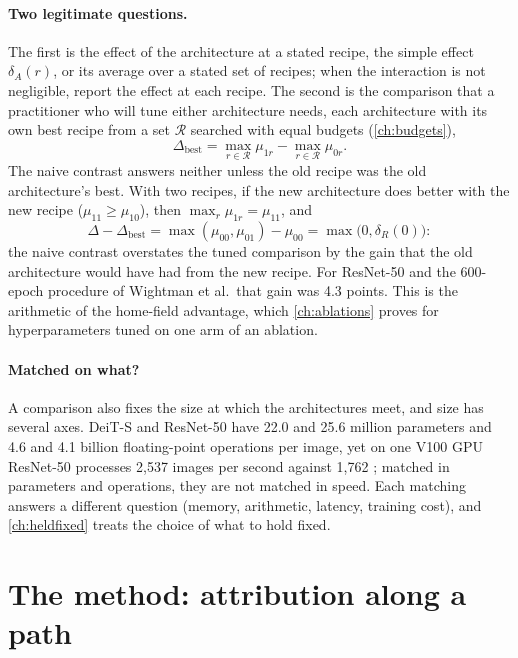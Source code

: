 \begin{refsection}
\paragraph{Two legitimate questions.} The first is the effect of the architecture at a stated recipe, the simple effect $\delta_A(r)$, or its average over a stated set of recipes; when the interaction is not negligible, report the effect at each recipe. The second is the comparison that a practitioner who will tune either architecture needs, each architecture with its own best recipe from a set $\mathcal R$ searched with equal budgets (\cref{ch:budgets}),
\[
\Delta_{\mathrm{best}}=\max_{r\in\mathcal R}\mu_{1r}-\max_{r\in\mathcal R}\mu_{0r}.
\]
The naive contrast answers neither unless the old recipe was the old architecture's best. With two recipes, if the new architecture does better with the new recipe ($\mu_{11}\ge\mu_{10}$), then $\max_r\mu_{1r}=\mu_{11}$, and
\[
\Delta-\Delta_{\mathrm{best}}=\max(\mu_{00},\mu_{01})-\mu_{00}=\max\bigl(0,\delta_R(0)\bigr):
\]
the naive contrast overstates the tuned comparison by the gain that the old architecture would have had from the new recipe. For ResNet-50 and the 600-epoch procedure of Wightman et al.\ that gain was 4.3 points. This is the arithmetic of the home-field advantage, which \cref{ch:ablations} proves for hyperparameters tuned on one arm of an ablation.

\paragraph{Matched on what?} A comparison also fixes the size at which the architectures meet, and size has several axes. DeiT-S and ResNet-50 have 22.0 and 25.6 million parameters and 4.6 and 4.1 billion floating-point operations per image, yet on one V100 GPU ResNet-50 processes 2,537 images per second against 1,762 \parencite{WightmanTouvronJegou2021}; matched in parameters and operations, they are not matched in speed. Each matching answers a different question (memory, arithmetic, latency, training cost), and \cref{ch:heldfixed} treats the choice of what to hold fixed.

\section{The method: attribution along a path}\label{sec:confounding:paths}


\end{refsection}
